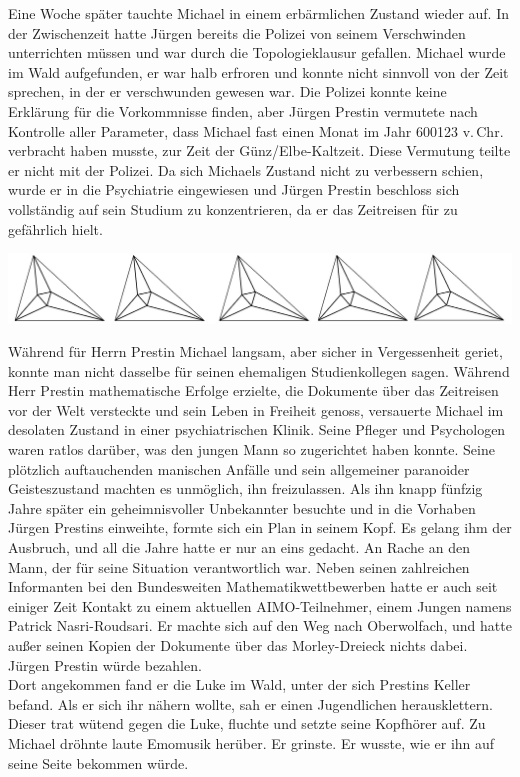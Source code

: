 \documentclass[oneside]{memoir}
\newcommand{\parasep}{
\bigskip
\bigskip
\begin{center} 
   \includegraphics[scale=.08]{parasep5.jpg} 
\end{center}
\bigskip
\bigskip
}
\begin{document}
Eine Woche später tauchte Michael in einem erbärmlichen Zustand wieder auf. In der Zwischenzeit hatte Jürgen bereits die Polizei von seinem Verschwinden unterrichten müssen und war durch die Topologieklausur gefallen. Michael wurde im Wald aufgefunden, er war halb erfroren und konnte nicht sinnvoll von der Zeit sprechen, in der er verschwunden gewesen war. Die Polizei konnte keine Erklärung für die Vorkommnisse finden, aber Jürgen Prestin vermutete nach Kontrolle aller Parameter, dass Michael fast einen Monat im Jahr 600123 v.\,Chr. verbracht haben musste, zur Zeit der Günz/Elbe-Kaltzeit. Diese Vermutung teilte er nicht mit der Polizei. Da sich Michaels Zustand nicht zu verbessern schien, wurde er in die  Psychiatrie eingewiesen und Jürgen Prestin beschloss sich vollständig auf sein Studium zu konzentrieren, da er das Zeitreisen für zu gefährlich hielt.
 
\parasep

\noindent Während für Herrn Prestin Michael langsam, aber sicher in Vergessenheit geriet, konnte man nicht dasselbe für seinen ehemaligen Studienkollegen sagen. Während Herr Prestin mathematische Erfolge erzielte, die Dokumente über das Zeitreisen vor der Welt versteckte und sein Leben in Freiheit genoss, versauerte Michael im desolaten Zustand in einer psychiatrischen Klinik. Seine Pfleger und Psychologen waren ratlos darüber, was den jungen Mann so zugerichtet haben konnte. Seine plötzlich auftauchenden manischen Anfälle und sein allgemeiner paranoider Geisteszustand machten es unmöglich, ihn freizulassen. Als ihn knapp fünfzig Jahre später ein geheimnisvoller Unbekannter besuchte und in die Vorhaben Jürgen Prestins einweihte, formte sich ein Plan in seinem Kopf. Es gelang ihm der Ausbruch, und all die Jahre hatte er nur an eins gedacht. An Rache an den Mann, der für seine Situation verantwortlich war. Neben seinen zahlreichen Informanten bei den Bundesweiten Mathematikwettbewerben hatte er auch seit einiger Zeit Kontakt zu einem aktuellen AIMO-Teilnehmer, einem Jungen namens Patrick Nasri-Roudsari. Er  machte sich auf den Weg nach Oberwolfach, und hatte außer seinen Kopien der Dokumente über das Morley-Dreieck nichts dabei. Jürgen Prestin würde bezahlen. \\
Dort angekommen fand er die Luke im Wald, unter der sich Prestins Keller befand. Als er sich ihr nähern wollte, sah er einen Jugendlichen herausklettern. Dieser trat wütend gegen die Luke, fluchte und setzte seine Kopfhörer auf. Zu Michael dröhnte laute Emomusik herüber. Er grinste. Er wusste, wie er ihn auf seine Seite bekommen würde.
\end{document}
